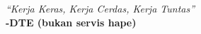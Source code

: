\documentclass[a4paper, 12pt]{article}
\begin{document}
    \begin{soal}
    \end{soal}

    \begin{jawaban}
    \end{jawaban}



    \newpage
    \thispagestyle{empty}


    \vspace*{\fill}
    \begin{center}
        \centering
        \textit{“Kerja Keras, Kerja Cerdas, Kerja Tuntas”} \\
        \textbf{-DTE (bukan servis hape)}
    \end{center}
    \vspace*{\fill}
\end{document}

